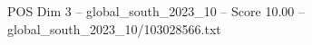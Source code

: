 \begin{textsample}{POS Dim 3 – global\_south\_2023\_10 – Score 10.00 – global\_south\_2023\_10/103028566.txt}
\end{textsample}
